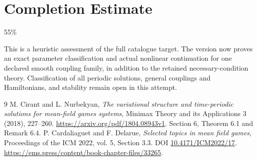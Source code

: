 \documentclass[11pt]{article}
\begin{document}
\section{Completion Estimate}
55\%

This is a heuristic assessment of the full catalogue target. The version
now proves an exact parameter classification and actual nonlinear
continuation for one declared smooth coupling family, in addition to the
retained necessary-condition theory. Classification of all periodic
solutions, general couplings and Hamiltonians, and stability remain open
in this attempt.

\begin{thebibliography}{9}
 M. Cirant and L. Nurbekyan,
\emph{The variational structure and time-periodic solutions for mean-field games systems},
Minimax Theory and its Applications 3 (2018), 227--260.
\url{https://arxiv.org/pdf/1804.08943v1}. Section 6, Theorem 6.1 and Remark 6.4.
 P. Cardaliaguet and F. Delarue,
\emph{Selected topics in mean field games}, Proceedings of the ICM 2022,
vol. 5, Section 3.3. DOI \href{https://doi.org/10.4171/ICM2022/17}{10.4171/ICM2022/17}.
\url{https://ems.press/content/book-chapter-files/33265}.
\end{thebibliography}
\end{document}

